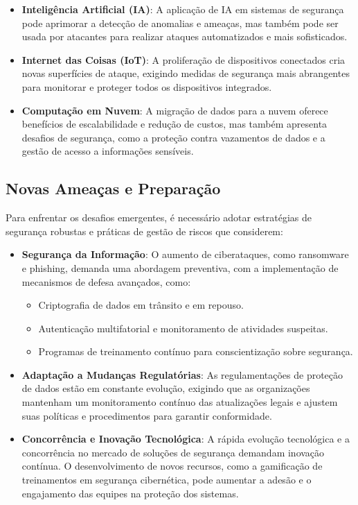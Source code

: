 \documentclass[12pt,oneside,a4paper,article]{abntex2}
\begin{document}
\begin{itemize}
    \item \textbf{Inteligência Artificial (IA)}: A aplicação de IA em sistemas de segurança pode aprimorar a detecção de anomalias e ameaças, mas também pode ser usada por atacantes para realizar ataques automatizados e mais sofisticados.
    \item \textbf{Internet das Coisas (IoT)}: A proliferação de dispositivos conectados cria novas superfícies de ataque, exigindo medidas de segurança mais abrangentes para monitorar e proteger todos os dispositivos integrados.
    \item \textbf{Computação em Nuvem}: A migração de dados para a nuvem oferece benefícios de escalabilidade e redução de custos, mas também apresenta desafios de segurança, como a proteção contra vazamentos de dados e a gestão de acesso a informações sensíveis.
\end{itemize}

\subsection{Novas Ameaças e Preparação}

Para enfrentar os desafios emergentes, é necessário adotar estratégias de segurança robustas e práticas de gestão de riscos que considerem:

\begin{itemize}
    \item \textbf{Segurança da Informação}: O aumento de ciberataques, como ransomware e phishing, demanda uma abordagem preventiva, com a implementação de mecanismos de defesa avançados, como:
    \begin{itemize}
        \item Criptografia de dados em trânsito e em repouso.
        \item Autenticação multifatorial e monitoramento de atividades suspeitas.
        \item Programas de treinamento contínuo para conscientização sobre segurança.
    \end{itemize}

    \item \textbf{Adaptação a Mudanças Regulatórias}: As regulamentações de proteção de dados estão em constante evolução, exigindo que as organizações mantenham um monitoramento contínuo das atualizações legais e ajustem suas políticas e procedimentos para garantir conformidade.
    
    \item \textbf{Concorrência e Inovação Tecnológica}: A rápida evolução tecnológica e a concorrência no mercado de soluções de segurança demandam inovação contínua. O desenvolvimento de novos recursos, como a gamificação de treinamentos em segurança cibernética, pode aumentar a adesão e o engajamento das equipes na proteção dos sistemas.
\end{itemize}
\end{document}
